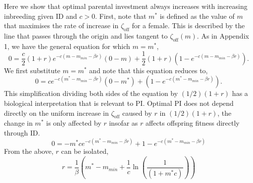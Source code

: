 \documentclass[12pt]{article}
\begin{document}
Here we show that optimal parental investment always increases with increasing inbreeding given ID and $c>0$. First, note that $m^{*}$ is defined as the value of $m$ that maximises the rate of increase in $\zeta_{\textrm{off}}$ for a female. This is described by the line that passes through the origin and lies tangent to $\zeta_{\textrm{off}}(m)$. As in Appendix 1, we have the general equation for which $m=m^{*}$,
\begin{equation}
0 = \frac{c}{2} \left(1+r\right)e^{-c\left(m-m_{min}-\beta r\right)}\left(0-m\right) + \frac{1}{2}\left(1+r\right)\left(1-e^{-c\left(m-m_{min}-\beta r\right)}\right).
\end{equation}
We first substitute $m=m^{*}$ and note that this equation reduces to,
\begin{equation}
0 = c e^{-c\left(m^{*}-m_{min}-\beta r\right)}\left(0-m^{*}\right) + \left(1-e^{-c\left(m^{*}-m_{min}-\beta r\right)}\right). 
\end{equation}
This simplification dividing both sides of the equation by $(1/2)(1+r)$ has a biological interpretation that is relevant to PI. Optimal PI does not depend directly on the uniform increase in $\zeta_{\textrm{off}}$ caused by $r$ in $(1/2)(1+r)$, the change in $m^{*}$ is only affected by $r$ insofar as $r$ affects offspring fitness directly through ID. 
\begin{equation}
0 = -m^{*} c e^{-c\left(m^{*}-m_{min}-\beta r\right)} + 1-e^{-c\left(m^{*}-m_{min}-\beta r\right)}
\end{equation}
From the above, $r$ can be isolated,
\begin{equation}
r = \frac{1}{\beta}\left(m^{*} - m_{min} + \frac{1}{c}\ln\left(\frac{1}{\left(1 + m^{*} c\right)}\right)\right)
\end{equation}
\end{document}
